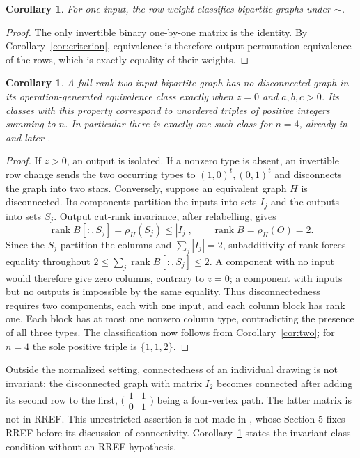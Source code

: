 \documentclass[11pt]{article}
\newtheorem{corollary}[theorem]{Corollary}
\newcommand{\rk}{\operatorname{rank}}
\begin{document}
\begin{corollary}
For one input, the row weight classifies bipartite graphs under $\sim$.
\end{corollary}
\begin{proof}
The only invertible binary one-by-one matrix is the identity. By
Corollary~\ref{cor:criterion}, equivalence is therefore output-permutation
equivalence of the rows, which is exactly equality of their weights.
\end{proof}

\begin{corollary}\label{cor:connected}
A full-rank two-input bipartite graph has no disconnected graph in its
operation-generated equivalence class exactly when $z=0$ and $a,b,c>0$.
Its classes with this property correspond to unordered triples of positive
integers summing to $n$. In particular there is exactly one such class
for $n=4$, already in \cite[Claim F, pp.~17--18]{Li} and later
\cite[Proposition 8.1, p.~22]{KL}.
\end{corollary}
\begin{proof}
If $z>0$, an output is isolated. If a nonzero type is absent, an invertible
row change sends the two occurring types to $(1,0)^t,(0,1)^t$ and disconnects
the graph into two stars. Conversely, suppose an equivalent graph $H$ is
disconnected. Its components partition the inputs into sets $I_j$ and
the outputs into sets $S_j$. Output cut-rank invariance, after relabelling,
gives
\[
 \rk B[:,S_j]=\rho_H(S_j)\leq |I_j|,
 \qquad \rk B=\rho_H(O)=2.
\]
Since the $S_j$ partition the columns and $\sum_j|I_j|=2$,
subadditivity of rank forces equality throughout
$2\leq\sum_j\rk B[:,S_j]\leq2$.
A component with no input would therefore give zero columns, contrary
to $z=0$; a component with inputs but no outputs is impossible by the
same equality. Thus disconnectedness requires two components, each with
one input, and each column block has rank one. Each block has at most one
nonzero column type, contradicting the presence of all three types.
The classification now follows from Corollary~\ref{cor:two}; for $n=4$
the sole positive triple is $\{1,1,2\}$.
\end{proof}

Outside the normalized setting, connectedness of an individual drawing
is not invariant: the disconnected graph with matrix $I_2$ becomes
connected after adding its second row to the first,
$\bigl(\begin{smallmatrix}1&1\\0&1\end{smallmatrix}\bigr)$ being a four-vertex
path. The latter matrix is not in RREF. This unrestricted assertion is
not made in \cite{KL0}, whose Section 5 fixes RREF before its discussion
of connectivity. Corollary~\ref{cor:connected} states the invariant
class condition without an RREF hypothesis.
\end{document}
